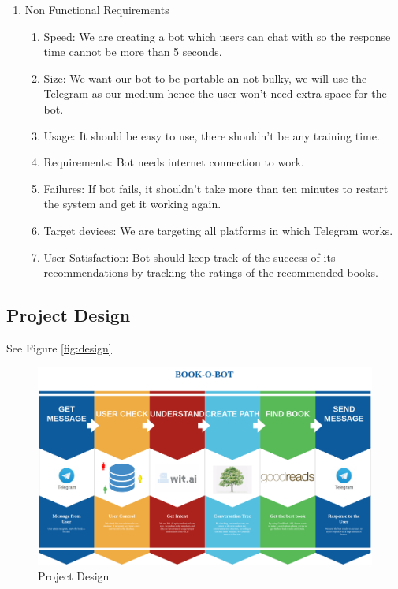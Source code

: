 \documentclass[a4paper]{article}
\begin{document}
\begin{enumerate}
\begin{enumerate}
\begin{enumerate}
    \end{enumerate}
  \end{enumerate}
\item Non Functional Requirements
  \begin{enumerate}
  \item Speed: We are creating a bot which users can chat with so the response time cannot be more than 5 seconds.
  \item Size: We want our bot to be portable an not bulky, we will use the Telegram as our medium hence the user won't need extra space for the bot.
  \item Usage: It should be easy to use, there shouldn't be any training time.
  \item Requirements: Bot needs internet connection to work.
  \item Failures: If bot fails, it shouldn't take more than ten minutes to restart the system and get it working again.
  \item Target devices: We are targeting all platforms in which Telegram works.
  \item User Satisfaction: Bot should keep track of the success of its recommendations by tracking the ratings of the recommended books.
  \end{enumerate}
\end{enumerate}
\newpage

\subsection{Project Design}

See Figure \autoref{fig:design}

\begin{figure}[!hb]
  \includegraphics[width=\linewidth]{figures/design.png}
  \caption{Project Design}
  \label{fig:design}
\end{figure}
\end{document}
